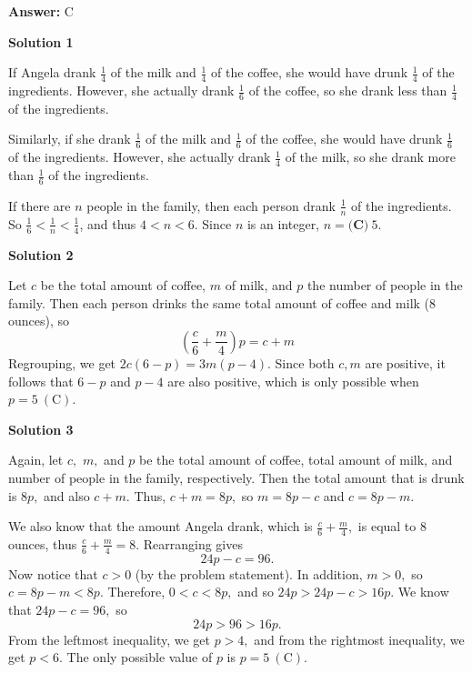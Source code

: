 \begin{enumerate}
 \textbf{Answer: }C



\textbf{Solution 1}

If Angela drank $\frac{1}{4}$ of the milk and $\frac{1}{4}$ of the coffee, she would have drunk $\frac{1}{4}$ of the ingredients.  However, she actually drank $\frac{1}{6}$ of the coffee, so she drank less than $\frac{1}{4}$ of the ingredients.

 Similarly, if she drank $\frac{1}{6}$ of the milk and $\frac{1}{6}$ of the coffee, she would have drunk $\frac{1}{6}$ of the ingredients.  However, she actually drank $\frac{1}{4}$ of the milk, so she drank more than $\frac{1}{6}$ of the ingredients.

 If there are $n$ people in the family, then each person drank $\frac{1}{n}$ of the ingredients.  So $\frac{1}{6} < \frac{1}{n} < \frac{1}{4}$, and thus $4 < n < 6$.  Since $n$ is an integer, $n = \boxed{\textbf{(C)}\ 5}$.

 



\textbf{Solution 2}

Let $c$ be the total amount of coffee, $m$ of milk, and $p$ the number of people in the family. Then each person drinks the same total amount of coffee and milk (8 ounces), so 
 \[\left(\frac{c}{6} + \frac{m}{4}\right)p = c + m\]Regrouping, we get $2c(6-p)=3m(p-4)$. Since both $c,m$ are positive, it follows that $6-p$ and $p-4$ are also positive, which is only possible when $p = 5\ \mathrm{(C)}$.

 



\textbf{Solution 3}

Again, let $c,$ $m,$ and $p$ be the total amount of coffee, total amount of milk, and number of people in the family, respectively. Then the total amount that is drunk is $8p,$ and also $c+m.$ Thus, $c+m = 8p,$ so $m = 8p-c$ and $c = 8p-m.$

 We also know that the amount Angela drank, which is $\frac{c}{6} + \frac{m}{4},$ is equal to $8$ ounces, thus $\frac{c}{6} + \frac{m}{4} = 8.$ Rearranging gives  
 \[24p - c = 96.\] Now notice that $c > 0$ (by the problem statement). In addition, $m > 0,$ so $c = 8p-m < 8p.$ Therefore, $0 < c < 8p,$ and so $24p > 24p-c > 16p.$ We know that $24p-c = 96,$ so 
 \[24p > 96 > 16p.\] From the leftmost inequality, we get $p > 4,$ and from the rightmost inequality, we get $p < 6.$ The only possible value of $p$ is $p = 5\ \mathrm{(C)}$.

 




\end{enumerate}
